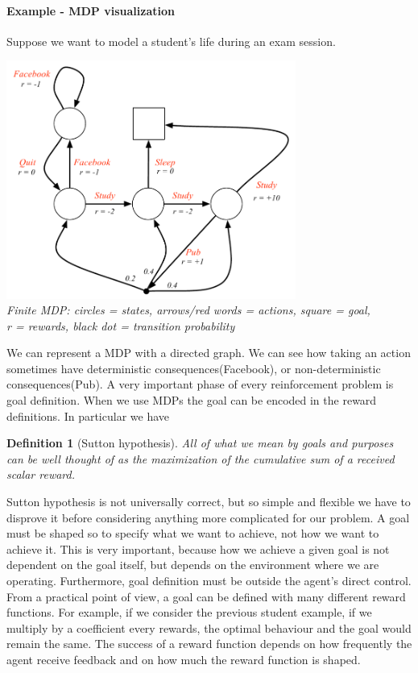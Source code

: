 \documentclass[main.tex]{subfiles}
\newtheorem{definition}{Definition}[section]
\begin{document}
\paragraph{Example - MDP visualization} Suppose we want to model a student's life during an exam session.
\begin{center}
    \includegraphics[width=95mm]{img/MDP.PNG}\\
    \textit{Finite MDP: circles = states, arrows/red words = actions, square = goal,}\\
    \textit{r = rewards, black dot = transition probability}
\end{center}
We can represent a MDP with a directed graph. We can see how taking an action sometimes have deterministic consequences(Facebook), or non-deterministic consequences(Pub).
\newline
\newline
A very important phase of every reinforcement problem is goal definition. When we use MDPs the goal can be encoded in the reward definitions. In particular we have
\begin{definition}[Sutton hypothesis]
    All of what we mean by goals and purposes can be well thought of as the maximization of the cumulative sum of a received scalar reward.
\end{definition}
Sutton hypothesis is not universally correct, but so simple and flexible we have to disprove it before considering anything more complicated for our problem.
A goal must be shaped so to specify what we want to achieve, not how we want to
achieve it. This is very important, because how we achieve a given goal is not dependent on the goal itself, but depends on the environment where we are operating. Furthermore, goal definition must be outside the agent’s direct control. From a practical point of view, a goal can be defined with many different reward functions. For example, if we consider the previous student example, if we multiply by a coefficient every rewards, the optimal behaviour and the goal would remain the same. The success of a reward function depends on how frequently the agent receive feedback and on how much the reward function is shaped\footnotemark. 
\end{document}
